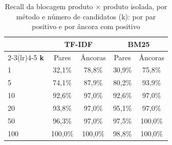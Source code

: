 \begin{table}[htbp]
\centering
\caption{Recall da blocagem produto $\times$ produto isolada, por método e número de candidatos (k): por par positivo e por âncora com positivo}
\label{tab:recall-blocagem-pxp}
\small
\begin{tabular}{lcccc}
\toprule
 & \multicolumn{2}{c}{\textbf{TF-IDF}} & \multicolumn{2}{c}{\textbf{BM25}} \\
\cmidrule(lr){2-3}\cmidrule(lr){4-5}
\textbf{k} & Pares & Âncoras & Pares & Âncoras \\
\midrule
1 & 32,1\% & 78,8\% & 30,9\% & 75,8\% \\
5 & 74,1\% & 87,9\% & 80,2\% & 93,9\% \\
10 & 92,6\% & 97,0\% & 92,6\% & 97,0\% \\
20 & 93,8\% & 97,0\% & 95,1\% & 97,0\% \\
50 & 96,3\% & 97,0\% & 97,5\% & 100,0\% \\
100 & 100,0\% & 100,0\% & 98,8\% & 100,0\% \\
\bottomrule
\end{tabular}
\vspace{2mm}
\end{table}
